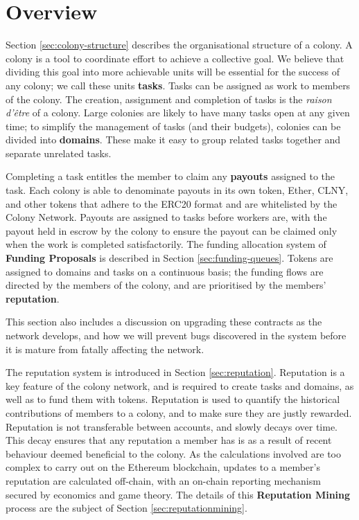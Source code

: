 \section{Overview}

Section \ref{sec:colony-structure} describes the organisational structure of a colony. A colony is a tool to coordinate effort to achieve a collective goal. We believe that dividing this goal into more achievable units will be essential for the success of any colony; we call these units \textbf{tasks}. Tasks can be assigned as work to members of the colony. The creation, assignment and completion of tasks is the \emph{raison d'{\^e}tre} of a colony. Large colonies are likely to have many tasks open at any given time; to simplify the management of tasks (and their budgets), colonies can be divided into \textbf{domains}. These make it easy to group related tasks together and separate unrelated tasks.

Completing a task entitles the member to claim any \textbf{payouts} assigned to the task. Each colony is able to denominate payouts in its own token, Ether, CLNY, and other tokens that adhere to the ERC20 format \cite{erc20} and are whitelisted by the Colony Network. Payouts are assigned to tasks before workers are, with the payout held in escrow by the colony to ensure the payout can be claimed only when the work is completed satisfactorily. The funding allocation system of \textbf{Funding Proposals} is described in Section \ref{sec:funding-queues}. Tokens are assigned to domains and tasks on a continuous basis; the funding flows are directed by the members of the colony, and are prioritised by the members' \textbf{reputation}.

This section also includes a discussion on upgrading these contracts as the network develops, and how we will prevent bugs discovered in the system before it is mature from fatally affecting the network.

The reputation system is introduced in Section \ref{sec:reputation}. Reputation is a key feature of the colony network, and is required to create tasks and domains, as well as to fund them with tokens. Reputation is used to quantify the historical contributions of members to a colony, and to make sure they are justly rewarded. Reputation is not transferable between accounts, and slowly decays over time. This decay ensures that any reputation a member has is as a result of recent behaviour deemed beneficial to the colony. As the calculations involved are too complex to carry out on the Ethereum blockchain, updates to a member's reputation are calculated off-chain, with an on-chain reporting mechanism secured by economics and game theory. The details of this \textbf{Reputation Mining} process are the subject of Section \ref{sec:reputationmining}.

